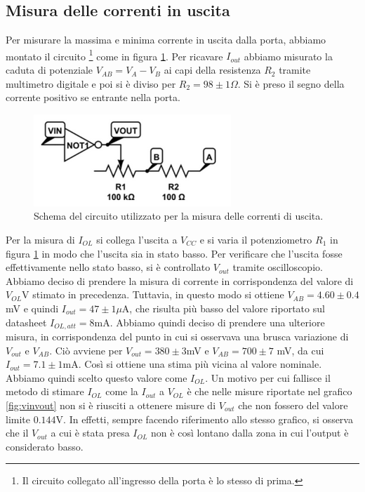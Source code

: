 \documentclass[10pt,a4paper]{article}
\begin{document}
\subsection{Misura delle correnti in uscita}
Per misurare la massima e minima corrente in uscita dalla porta, abbiamo montato il circuito \footnote{Il circuito collegato all'ingresso della porta è lo stesso di prima.} come in figura \ref{fig:circuito2}. Per ricavare $I_{out}$ abbiamo misurato la caduta di potenziale $V_{AB}=V_A-V_B$ ai capi della resistenza $R_2$ tramite multimetro digitale e poi si è diviso per $R_2=98\pm 1 \Omega$. Si è preso il segno della corrente positivo se entrante nella porta.
\begin{figure}
\centering
\includegraphics[scale=0.7]{circuito2.png}
\caption{Schema del circuito utilizzato per la misura delle correnti di uscita.\label{fig:circuito2}}
\end{figure}
Per la misura di $I_{OL}$ si collega l'uscita a $V_{CC}$  e si varia il potenziometro $R_1$ in figura \ref{fig:circuito2} in modo che l'uscita sia in stato basso.
Per verificare che l'uscita fosse effettivamente nello stato basso, si è controllato $V_{out}$ tramite oscilloscopio. Abbiamo deciso di prendere la misura di corrente in corrispondenza del valore di $V_{OL}$V stimato in precedenza. Tuttavia, in questo modo si ottiene $V_{AB}=4.60\pm 0.4$mV e quindi $I_{out}=47\pm 1 \mu \mbox{A}$, che risulta più basso del valore riportato sul datasheet $I_{OL,att}=8$mA. Abbiamo quindi deciso di prendere una ulteriore misura, in corrispondenza del punto in cui si osservava una brusca variazione di $V_{out}$ e $V_{AB}$. Ciò avviene per $V_{out}=380\pm3$mV e $V_{AB}=700\pm7$ mV, da cui $I_{out}=7.1\pm 1$mA. 
Così si ottiene una stima più vicina al valore nominale. Abbiamo quindi scelto questo valore come $I_{OL}$. Un motivo per cui fallisce il metodo di stimare $I_{OL}$ come la $I_{out}$ a $V_{OL}$ è che nelle misure riportate nel grafico \ref{fig:vinvout} non si è riusciti a ottenere misure di $V_{out}$ che non fossero del valore limite $0.144$V. In effetti, sempre facendo riferimento allo stesso grafico, si osserva che il $V_{out}$ a cui è stata presa $I_{OL}$ non è così lontano dalla zona in cui l'output è considerato basso.
\end{document}
